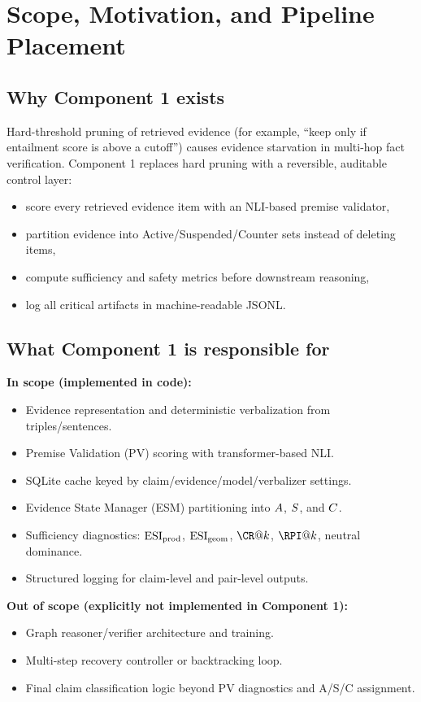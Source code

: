 \section{Scope, Motivation, and Pipeline Placement}
\label{sec:c1_scope}

\subsection{Why Component 1 exists}
Hard-threshold pruning of retrieved evidence (for example, ``keep only if entailment score is above a cutoff'')
causes evidence starvation in multi-hop fact verification.
Component 1 replaces hard pruning with a reversible, auditable control layer:
\begin{itemize}
\item score every retrieved evidence item with an NLI-based premise validator,
\item partition evidence into Active/Suspended/Counter sets instead of deleting items,
\item compute sufficiency and safety metrics before downstream reasoning,
\item log all critical artifacts in machine-readable JSONL.
\end{itemize}

\subsection{What Component 1 is responsible for}
\textbf{In scope (implemented in code):}
\begin{itemize}
\item Evidence representation and deterministic verbalization from triples/sentences.
\item Premise Validation (PV) scoring with transformer-based NLI.
\item SQLite cache keyed by claim/evidence/model/verbalizer settings.
\item Evidence State Manager (ESM) partitioning into $A$, $S$, and $C$.
\item Sufficiency diagnostics: $\operatorname{ESI}_{\mathrm{prod}}$, $\operatorname{ESI}_{\mathrm{geom}}$, $\CR@k$, $\RPI@k$, neutral dominance.
\item Structured logging for claim-level and pair-level outputs.
\end{itemize}

\textbf{Out of scope (explicitly not implemented in Component 1):}
\begin{itemize}
\item Graph reasoner/verifier architecture and training.
\item Multi-step recovery controller or backtracking loop.
\item Final claim classification logic beyond PV diagnostics and A/S/C assignment.
\end{itemize}

